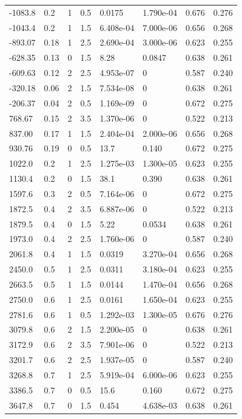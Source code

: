 \documentclass[preview]{standalone}
\begin{document}
{{\begin{tabular}{L{1.2cm}C{1.2cm} C{0.3cm}C{0.5cm} C{1.4cm}C{1.4cm} C{1.4cm}C{1.4cm}}
  -1083.8  &   0.2  & 1     & 0.5 &  0.0175  & 1.790e-04  & 0.676 &  0.276   \\ 
  -1043.4  &   0.2  & 1     & 1.5 &  6.408e-04  & 7.000e-06  & 0.656 &  0.268   \\ 
  -893.07  &  0.18  & 1     & 2.5 &  2.690e-04  & 3.000e-06  & 0.623 &  0.255   \\ 
  -628.35  &  0.13  & 0     & 1.5 &  8.28  & 0.0847  & 0.638 &  0.261   \\ 
  -609.63  &  0.12  & 2     & 2.5 &  4.953e-07  & 0  & 0.587 &  0.240   \\ 
  -320.18  &  0.06  & 2     & 1.5 &  7.534e-08  & 0  & 0.638 &  0.261   \\ 
  -206.37  &  0.04  & 2     & 0.5 &  1.169e-09  & 0  & 0.672 &  0.275   \\ 
  768.67  &  0.15  & 2     & 3.5 &  1.370e-06  & 0  & 0.522 &  0.213   \\ 
  837.00  &  0.17  & 1     & 1.5 &  2.404e-04  & 2.000e-06  & 0.656 &  0.268   \\ 
  930.76  &  0.19  & 0     & 0.5 &  13.7  & 0.140  & 0.672 &  0.275   \\ 
  1022.0  &   0.2  & 1     & 2.5 &  1.275e-03  & 1.300e-05  & 0.623 &  0.255   \\ 
  1130.4  &   0.2  & 0     & 1.5 &  38.1  & 0.390  & 0.638 &  0.261   \\ 
  1597.6  &   0.3  & 2     & 0.5 &  7.164e-06  & 0  & 0.672 &  0.275   \\ 
  1872.5  &   0.4  & 2     & 3.5 &  6.887e-06  & 0  & 0.522 &  0.213   \\ 
  1879.5  &   0.4  & 0     & 1.5 &  5.22  & 0.0534  & 0.638 &  0.261   \\ 
  1973.0  &   0.4  & 2     & 2.5 &  1.760e-06  & 0  & 0.587 &  0.240   \\ 
  2061.8  &   0.4  & 1     & 1.5 &  0.0319  & 3.270e-04  & 0.656 &  0.268   \\ 
  2450.0  &   0.5  & 1     & 2.5 &  0.0311  & 3.180e-04  & 0.623 &  0.255   \\ 
  2663.5  &   0.5  & 1     & 1.5 &  0.0144  & 1.470e-04  & 0.656 &  0.268   \\ 
  2750.0  &   0.6  & 1     & 2.5 &  0.0161  & 1.650e-04  & 0.623 &  0.255   \\ 
  2781.6  &   0.6  & 1     & 0.5 &  1.292e-03  & 1.300e-05  & 0.676 &  0.276   \\ 
  3079.8  &   0.6  & 2     & 1.5 &  2.200e-05  & 0  & 0.638 &  0.261   \\ 
  3172.9  &   0.6  & 2     & 3.5 &  7.901e-06  & 0  & 0.522 &  0.213   \\ 
  3201.7  &   0.6  & 2     & 2.5 &  1.937e-05  & 0  & 0.587 &  0.240   \\ 
  3268.8  &   0.7  & 1     & 2.5 &  5.919e-04  & 6.000e-06  & 0.623 &  0.255   \\ 
  3386.5  &   0.7  & 0     & 0.5 &  15.6  & 0.160  & 0.672 &  0.275   \\ 
  3647.8  &   0.7  & 0     & 1.5 &  0.454  & 4.638e-03  & 0.638 &  0.261   \\ 
\hline 
\end{tabular} 

}}
\end{document}
